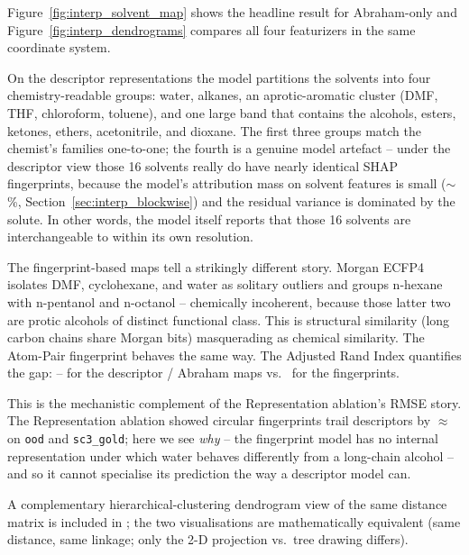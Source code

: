 Figure~\ref{fig:interp_solvent_map} shows the headline result for
Abraham-only and Figure~\ref{fig:interp_dendrograms} compares all
four featurizers in the same coordinate system.

On the descriptor representations the model partitions the solvents
into four chemistry-readable groups: water, alkanes, an
aprotic-aromatic cluster (DMF, THF, chloroform, toluene), and one
large band that contains the alcohols, esters, ketones, ethers,
acetonitrile, and dioxane.  The first three groups match the chemist's
families one-to-one; the fourth is a genuine model artefact -- under
the descriptor view those 16 solvents really do have nearly identical
SHAP fingerprints, because the model's attribution mass on solvent
features is small (\(\sim\)\,\%, Section~\ref{sec:interp_blockwise})
and the residual variance is dominated by the solute.  In other words,
the model itself reports that those 16 solvents are interchangeable
to within its own resolution.

The fingerprint-based maps tell a strikingly different story.  Morgan
ECFP4 isolates DMF, cyclohexane, and water as solitary outliers and
groups n-hexane with n-pentanol and n-octanol -- chemically
incoherent, because those latter two are protic alcohols of distinct
functional class.  This is structural similarity (long carbon chains
share Morgan bits) masquerading as chemical similarity.  The Atom-Pair
fingerprint behaves the same way.  The Adjusted Rand Index quantifies
the gap: -- for the descriptor / Abraham
maps vs.\  for the fingerprints.

This is the mechanistic complement of the Representation ablation's
RMSE story.  The Representation ablation showed circular fingerprints
trail descriptors by \(\approx\)  \RMSE{} on
\texttt{ood} and \texttt{sc3\_gold}; here we see \emph{why} -- the
fingerprint model has no internal representation under which water
behaves differently from a long-chain alcohol -- and so it cannot
specialise its prediction the way a descriptor model can.

A complementary hierarchical-clustering dendrogram view of the same
distance matrix is included in
;
the two visualisations are mathematically equivalent (same distance,
same linkage; only the 2-D projection vs.\ tree drawing differs).

